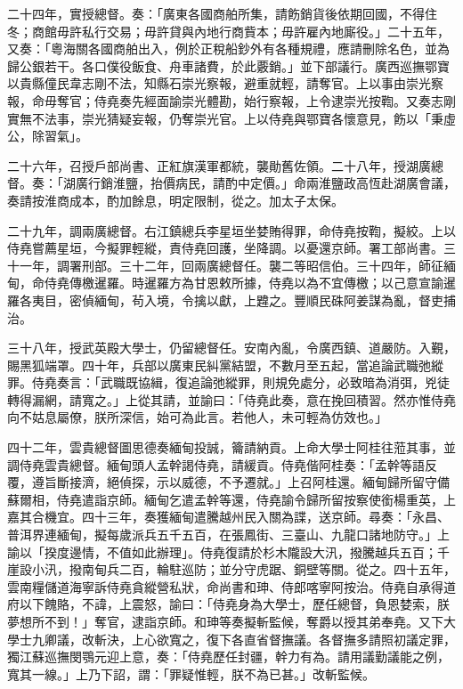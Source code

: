 \begin{pinyinscope}
二十四年，實授總督。奏：「廣東各國商舶所集，請飭銷貨後依期回國，不得住冬；商館毋許私行交易；毋許貸與內地行商貲本；毋許雇內地廝役。」二十五年，又奏：「粵海關各國商舶出入，例於正稅船鈔外有各種規禮，應請刪除名色，並為歸公銀若干。各口僕役飯食、舟車諸費，於此覈銷。」並下部議行。廣西巡撫鄂寶以貴縣僮民韋志剛不法，知縣石崇光察報，避重就輕，請奪官。上以事由崇光察報，命毋奪官；侍堯奏先經面諭崇光體勘，始行察報，上令逮崇光按鞫。又奏志剛實無不法事，崇光猜疑妄報，仍奪崇光官。上以侍堯與鄂寶各懷意見，飭以「秉虛公，除習氣」。

二十六年，召授戶部尚書、正紅旗漢軍都統，襲勛舊佐領。二十八年，授湖廣總督。奏：「湖廣行銷淮鹽，抬價病民，請酌中定價。」命兩淮鹽政高恆赴湖廣會議，奏請按淮商成本，酌加餘息，明定限制，從之。加太子太保。

二十九年，調兩廣總督。右江鎮總兵李星垣坐婪賄得罪，命侍堯按鞫，擬絞。上以侍堯嘗薦星垣，今擬罪輕縱，責侍堯回護，坐降調。以憂還京師。署工部尚書。三十一年，調署刑部。三十二年，回兩廣總督任。襲二等昭信伯。三十四年，師征緬甸，命侍堯傳檄暹羅。時暹羅方為甘恩敕所據，侍堯以為不宜傳檄；以己意宣諭暹羅各夷目，密偵緬甸，茍入境，令擒以獻，上韙之。豐順民硃阿姜謀為亂，督吏捕治。

三十八年，授武英殿大學士，仍留總督任。安南內亂，令廣西鎮、道嚴防。入覲，賜黑狐端罩。四十年，兵部以廣東民糾黨結盟，不數月至五起，當追論武職弛縱罪。侍堯奏言：「武職既協緝，復追論弛縱罪，則規免處分，必致暗為消弭，兇徒轉得漏網，請寬之。」上從其請，並諭曰：「侍堯此奏，意在挽回積習。然亦惟侍堯向不姑息屬僚，朕所深信，始可為此言。若他人，未可輕為仿效也。」

四十二年，雲貴總督圖思德奏緬甸投誠，籥請納貢。上命大學士阿桂往蒞其事，並調侍堯雲貴總督。緬甸頭人孟幹謁侍堯，請緩貢。侍堯偕阿桂奏：「孟幹等語反覆，遵旨斷接濟，絕偵探，示以威德，不予遷就。」上召阿桂還。緬甸歸所留守備蘇爾相，侍堯遣詣京師。緬甸乞遣孟幹等還，侍堯諭令歸所留按察使銜楊重英，上嘉其合機宜。四十三年，奏獲緬甸遣騰越州民入關為諜，送京師。尋奏：「永昌、普洱界連緬甸，擬每歲派兵五千五百，在張鳳街、三臺山、九龍口諸地防守。」上諭以「揆度邊情，不值如此辦理」。侍堯復請於杉木隴設大汛，撥騰越兵五百；千崖設小汛，撥南甸兵二百，輪駐巡防；並分守虎踞、銅壁等關。從之。四十五年，雲南糧儲道海寧訴侍堯貪縱營私狀，命尚書和珅、侍郎喀寧阿按治。侍堯自承得道府以下餽賂，不諱，上震怒，諭曰：「侍堯身為大學士，歷任總督，負恩婪索，朕夢想所不到！」奪官，逮詣京師。和珅等奏擬斬監候，奪爵以授其弟奉堯。又下大學士九卿議，改斬決，上心欲寬之，復下各直省督撫議。各督撫多請照初議定罪，獨江蘇巡撫閔鶚元迎上意，奏：「侍堯歷任封疆，幹力有為。請用議勤議能之例，寬其一線。」上乃下詔，謂：「罪疑惟輕，朕不為已甚。」改斬監候。


\end{pinyinscope}
